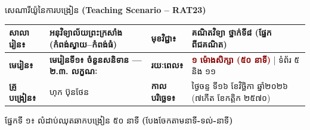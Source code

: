\documentclass[a4paper,10pt]{article}
\newcommand{\en}[1]{{\TimesEn #1}}
\newcommand{\enbf}[1]{{\TimesEn\textbf{#1}}}
\begin{document}
\fontsize{9.8pt}{14.6pt}\selectfont

\begin{center}
{\muol\fontsize{11pt}{15pt}\selectfont សេណារីយ៉ូនៃការបង្រៀន \enbf{(Teaching Scenario -- RAT23)}}
\end{center}
\vspace{2pt}

\noindent\begin{tabular}{|L{2.00cm}|L{6.75cm}|L{1.85cm}|L{7.40cm}|}
\hline
{}
\textbf{សាលារៀន៖} & អនុវិទ្យាល័យព្រះក្រសាំង (កំពង់ស្វាយ--កំពង់ធំ) & \textbf{មុខវិជ្ជា៖} & គណិតវិទ្យា ថ្នាក់ទី៨ (ផ្នែកពីជគណិត) \\
\hline
\textbf{មេរៀន៖} & \textbf{មេរៀនទី១៖ ចំនួនសនិទាន — ២.៣. លក្ខណៈ} & \textbf{រយៈពេល៖} & \textcolor{darkred}{\textbf{១ ម៉ោងសិក្សា (៥០ នាទី)}} \en{|} ទំព័រ ៥ និង ១១ \\
\hline
\textbf{គ្រូបង្រៀន៖} & ហុក ប៊ុនថែន & \textbf{កាលបរិច្ឆេទ៖} & ថ្ងៃចន្ទ ទី១៦ ខែវិច្ឆិកា ឆ្នាំ២០២៦ (៧កើត ខែកត្តិក ២៥៧០) \\
\hline
\end{tabular}

\vspace{4pt}
{\muol ផ្នែកទី ១៖ លំដាប់ឈុតឆាកបង្រៀន ៥០ នាទី \enbf{(}បែងចែកតាមនាទី\enbf{-}ទល់\enbf{-}នាទី\enbf{)}}
\vspace{2pt}
\end{document}

